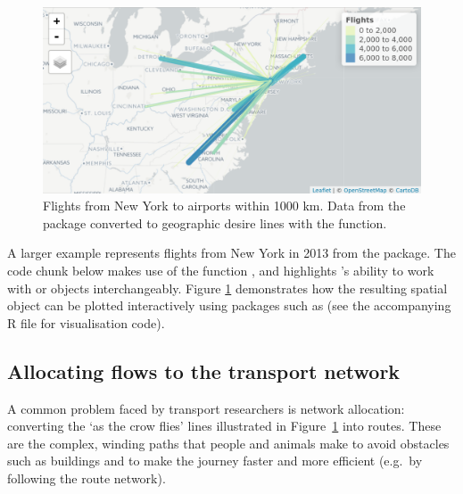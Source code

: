 \begin{figure}
\includegraphics[width=\textwidth]{flights} \caption[Flights from New York]{Flights from New York to airports within 1000 km. Data from the  package converted to geographic desire lines with the  function.}\label{fig:flights}
\end{figure}

A larger example represents flights from New York in 2013 from the  package.
The code chunk below makes use of the function , and highlights 's ability to work with  or  objects interchangeably.
Figure \ref{fig:flights} demonstrates how the resulting spatial object can be plotted interactively using packages such as  (see the accompanying R file for visualisation code).

\begin{Schunk}
\end{Schunk}

\subsection{Allocating flows to the transport network}
\label{allocating-flows-to-the-transport-network}

A common problem faced by transport researchers is network allocation:
converting the `as the crow flies' lines illustrated in Figure~\ref{fig:flights}
into routes. These are the complex, winding paths that people and
animals make to avoid obstacles such as buildings and to make the
journey faster and more efficient (e.g.~by following the route network).

